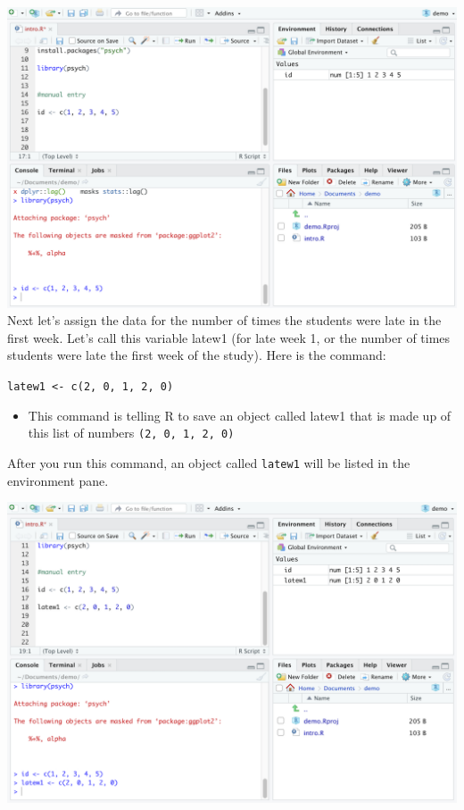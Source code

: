 \documentclass[
]{book}
\providecommand{\tightlist}{%
  \setlength{\itemsep}{0pt}\setlength{\parskip}{0pt}}
\begin{document}
\includegraphics{img/DATA THINGS R11.png}\\
Next let's assign the data for the number of times the students were late in the first week. Let's call this variable latew1 (for late week 1, or the number of times students were late the first week of the study). Here is the command:

\texttt{latew1\ \textless{}-\ c(2,\ 0,\ 1,\ 2,\ 0)}

\begin{itemize}
\tightlist
\item
  This command is telling R to save an object called latew1 that is made up of this list of numbers \texttt{(2,\ 0,\ 1,\ 2,\ 0)}
\end{itemize}

After you run this command, an object called \texttt{latew1} will be listed in the environment pane.

\includegraphics{img/DATA THINGS 1R2.png}
\end{document}
